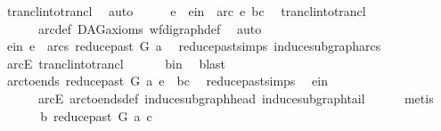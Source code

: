 \begin{isabellebody}
\ trancl{\isacharunderscore}{\kern0pt}into{\isacharunderscore}{\kern0pt}trancl\ \isamarkupfalse%
\ auto\isanewline
\ \ \isamarkupfalse%
\ \isamarkupfalse%
\ e\ \ e{\isacharunderscore}{\kern0pt}in{\isacharcolon}{\kern0pt}\ {\isachardoublequoteopen}\ arc\ e\ {\isacharparenleft}{\kern0pt}b{\isacharcomma}{\kern0pt}c{\isacharparenright}{\kern0pt}{\isachardoublequoteclose}\ \isamarkupfalse%
\ trancl{\isacharunderscore}{\kern0pt}into{\isacharunderscore}{\kern0pt}trancl\ \isanewline
\ \ \ \ \ \ arc{\isacharunderscore}{\kern0pt}def\ DAG{\isacharunderscore}{\kern0pt}axioms\ wf{\isacharunderscore}{\kern0pt}digraph{\isacharunderscore}{\kern0pt}def\ \isamarkupfalse%
\ auto\ \isanewline
\ \ \isamarkupfalse%
\ \isamarkupfalse%
\ e{\isacharunderscore}{\kern0pt}in{}{\isacharcolon}{\kern0pt}\ {\isachardoublequoteopen}e\ {\isasymin}\ arcs\ {\isacharparenleft}{\kern0pt}reduce{\isacharunderscore}{\kern0pt}past\ G\ a{\isacharparenright}{\kern0pt}{\isachardoublequoteclose}\ \isamarkupfalse%
\ reduce{\isacharunderscore}{\kern0pt}past{\isachardot}{\kern0pt}simps\ induce{\isacharunderscore}{\kern0pt}subgraph{\isacharunderscore}{\kern0pt}arcs\isanewline
\ \ \ \ \isamarkupfalse%
\ arcE\ trancl{\isacharunderscore}{\kern0pt}into{\isacharunderscore}{\kern0pt}trancl\isanewline
\ \ \ \ \ \ b{\isacharunderscore}{\kern0pt}in\ \isamarkupfalse%
\ blast\ \isanewline
\ \ \isamarkupfalse%
\ \isamarkupfalse%
\ {\isachardoublequoteopen}arc{\isacharunderscore}{\kern0pt}to{\isacharunderscore}{\kern0pt}ends\ {\isacharparenleft}{\kern0pt}reduce{\isacharunderscore}{\kern0pt}past\ G\ a{\isacharparenright}{\kern0pt}\ e\ {\isacharequal}{\kern0pt}\ {\isacharparenleft}{\kern0pt}b{\isacharcomma}{\kern0pt}c{\isacharparenright}{\kern0pt}{\isachardoublequoteclose}\ \isamarkupfalse%
\ reduce{\isacharunderscore}{\kern0pt}past{\isachardot}{\kern0pt}simps\ \isamarkupfalse%
\ e{\isacharunderscore}{\kern0pt}in\isanewline
\ \ \ \ \ \ arcE\ arc{\isacharunderscore}{\kern0pt}to{\isacharunderscore}{\kern0pt}ends{\isacharunderscore}{\kern0pt}def\ induce{\isacharunderscore}{\kern0pt}subgraph{\isacharunderscore}{\kern0pt}head\ induce{\isacharunderscore}{\kern0pt}subgraph{\isacharunderscore}{\kern0pt}tail\isanewline
\ \ \ \ \isamarkupfalse%
\ metis\ \ \isanewline
\ \ \isamarkupfalse%
\ \isamarkupfalse%
\ \ {\isachardoublequoteopen}b\ {\isasymrightarrow}\isactrlbsub reduce{\isacharunderscore}{\kern0pt}past\ G\ a\isactrlesub \ c{\isachardoublequoteclose}\ \isamarkupfalse%

\end{isabellebody}
